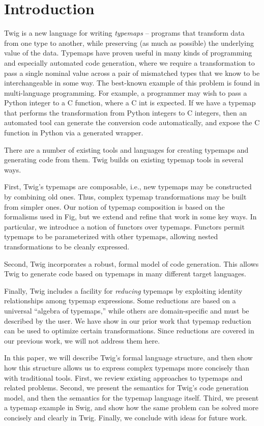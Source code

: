 
\section{Introduction}

Twig is a new language for writing \emph{typemaps} -- programs that transform data from one type to another, while preserving (as much as possible) the underlying value of the data. Typemaps have proven useful in many kinds of programming and especially automated code generation, where we require a transformation to pass a single nominal value across a pair of mismatched types that we know to be interchangeable in some way. The best-known example of this problem is found in multi-language programming. For example, a programmer may wish to pass a Python integer to a C function, where a C int is expected. If we have a typemap that performs the transformation from Python integers to C integers, then an automated tool can generate the conversion code automatically, and expose the C function in Python via a generated wrapper.

There are a number of existing tools and languages for creating typemaps and generating code from them. Twig builds on existing typemap tools in several ways.

First, Twig's typemaps are composable, i.e., new typemaps may be constructed by combining old ones. Thus, complex typemap transformations may be built from simpler ones. Our notion of typemap composition is based on the formalisms used in Fig\cite{reppy:fig}, but we extend and refine that work in some key ways. In particular, we introduce a notion of functors over typemaps. Functors permit typemaps to be parameterized with other typemaps, allowing nested transformations to be cleanly expressed.

Second, Twig incorporates a robust, formal model of code generation. This allows Twig to generate code based on typemaps in many different target languages.

Finally, Twig includes a facility for \emph{reducing} typemaps by exploiting identity relationships among typemap expressions. Some reductions are based on a universal ``algebra of typemaps,'' while others are domain-specific and must be described by the user. We have show in our prior work \cite{ourselves} that typemap reduction can be used to optimize certain transformations. Since reductions are covered in our previous work, we will not address them here.

In this paper, we will describe Twig's formal language structure, and then show how this structure allows us to express complex typemaps more concisely than with traditional tools. First, we review existing approaches to typemaps and related problems. Second, we present the semantics for Twig's code generation model, and then the semantics for the typemap language itself. Third, we present a typemap example in Swig, and show how the same problem can be solved more concisely and clearly in Twig. Finally, we conclude with ideas for future work.
